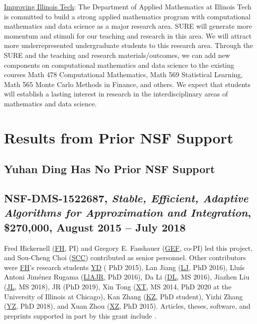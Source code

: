 \documentclass[11pt]{NSFamsart}
\newcommand{\Upara}[1]{\noindent\underline{\upshape #1}:}
\newcommand{\FH}{\hyperlink{FHlink}{FH}\xspace}
\newcommand{\SCTC}{\hyperlink{SCTClink}{SCC}\xspace}
\newcommand{\GEF}{\hyperlink{GEFlink}{GEF}\xspace}
\newcommand{\YD}{\hyperlink{YDlink}{YD}\xspace}
\newcommand{\LlAJR}{\hyperlink{LlAJRlink}{LlAJR}\xspace}
\newcommand{\LJ}{\hyperlink{LJlink}{LJ}\xspace}
\newcommand{\XT}{\hyperlink{XTlink}{XT}\xspace}
\newcommand{\KZ}{\hyperlink{KZlink}{KZ}\xspace}
\newcommand{\DL}{\hyperlink{DLlink}{DL}\xspace}
\newcommand{\XZ}{\hyperlink{XZlink}{XZ}\xspace}
\newcommand{\JL}{\hyperlink{JLlink}{JL}\xspace}
\newcommand{\YZ}{\hyperlink{YZlink}{YZ}\xspace}
\begin{document}
\Upara{Improving Illinois Tech}
The Department of Applied Mathematics at Illinois Tech is committed to build a strong applied mathematics program with computational mathematics and data science as a major research area. 
SURE will generate more momentum and stimuli for our teaching and research in this area. We will attract more underrepresented undergraduate students to this research area. Through the SURE and the teaching and research materials/outcomes, we can add new components on computational mathematics and data science to the existing courses Math 478 Computational Mathematics, Math 569 Statistical Learning, Math 565 Monte Carlo Methods in Finance, and others.
We expect that students will establish a lasting interest in research in the interdisciplinary areas of mathematics and data science.



\section{Results from Prior NSF Support} \label{sec:prior_work}

\subsection{Yuhan Ding Has No Prior NSF Support}

\subsection{NSF-DMS-1522687, \emph{Stable, Efficient, Adaptive Algorithms for
			Approximation and Integration},
		\$270,000, August 2015 -- July 2018} \label{sec:PreviousFred}
Fred Hickernell (\FH, PI) and Gregory E. Fasshauer (\GEF, co-PI) led this project, and Sou-Cheng Choi (\SCTC) contributed as senior personnel.  Other contributors were \FH's research students {\YD} ( PhD 2015), \hypertarget{LJlink}{ Lan Jiang } (\LJ, PhD 2016),
\hypertarget{LlAJRlink}{Llu\'is Antoni Jim\'enez Rugama} (\LlAJR, PhD 2016), \hypertarget{DLlink}{Da Li} (\DL, MS 2016), \hypertarget{JLlink}{Jiazhen Liu} (\JL, MS 2018), JR (PhD 2019), \hypertarget{XTlink}{Xin Tong} (\XT, MS 2014, PhD 2020 at the University of Illinois at Chicago), \hypertarget{KZlink}{Kan Zhang} (\KZ, PhD student), \hypertarget{YZlink}{Yizhi Zhang} (\YZ, PhD 2018), and \hypertarget{XZlink}{Xuan Zhou} (\XZ, PhD 2015).  Articles, theses,
software, and preprints supported in
part by this
grant
include
\cite{ala_augmented_2017,
	ChoEtal17a,
	ChoEtal21a,
	Din15a,
	DinHic20a,
	GilEtal16a,
	Hic17a,
	HicJag18b,
	HicJim16a,
	HicEtal18a,
	HicEtal17a,
	HicKriWoz19a,
	RatHic19a,
	GilJim16b,
	JimHic16a,
	JohFasHic18a,
	Li16a,
	Liu17a,
	MarEtal18a,
	mccourt_stable_2017,
	MCCEtal19a,
	mishra_hybrid_2018,
	MisEtal19a,
	rashidinia_stable_2016,
	rashidinia_stable_2018,
	Zha18a,
	Zha17a,
	Zho15a,
	ZhoHic15a}.
\end{document}
